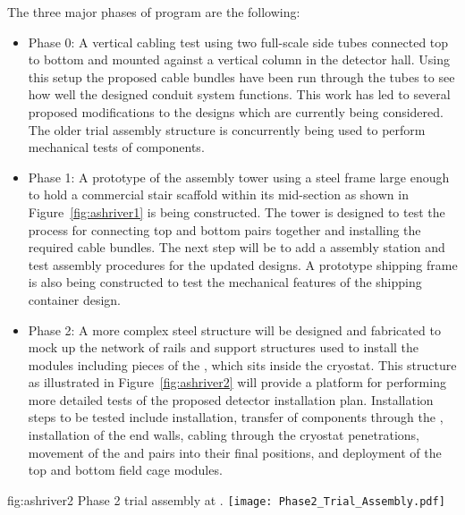 The three major phases of  program are the following:
\begin{itemize}
  \item {Phase 0:} A vertical cabling test using two full-scale 
          side tubes connected top to bottom and mounted 
         against a vertical column in the detector hall.  Using this 
         setup the proposed cable bundles have been run through the 
         tubes to see how well the designed conduit system functions.
         This work has led to several proposed modifications to the 
         designs which are currently being considered.  The older 
          trial assembly structure is concurrently 
         being used to perform mechanical tests of  
         components. 
  \item {Phase 1:} A prototype of the   
         assembly tower using a steel frame large enough to hold a 
         commercial stair scaffold within its mid-section as shown 
         in Figure~\ref{fig:ashriver1} is being constructed.  The 
         tower is designed to test the process for connecting top 
         and bottom  pairs together and installing the 
         required cable bundles.  The next step will be to add a
          assembly station and test assembly procedures 
         for the updated  designs.  A prototype 
          shipping frame is also being constructed to 
         test the mechanical features of the shipping container 
         design.  
  \item {Phase 2:} A more complex steel structure will be 
         designed and fabricated to mock up the network of rails 
         and support structures used to install the 
          modules including pieces of the , 
         which sits inside the cryostat.  This structure as 
         illustrated in Figure~\ref{fig:ashriver2} will provide 
         a platform for performing more detailed tests of the 
         proposed detector installation plan.  Installation steps 
         to be tested include  installation, transfer 
         of  components through the , 
         installation of the  end walls, cabling 
         through the cryostat penetrations, movement of the 
          and   pairs into their final 
         positions, and deployment of the top and bottom field 
         cage modules.
\end{itemize}
\begin{dunefigure}{fig:ashriver2}
  {Phase 2 trial assembly at .}
  \texttt{[image: Phase2\_Trial\_Assembly.pdf]}
\end{dunefigure}

